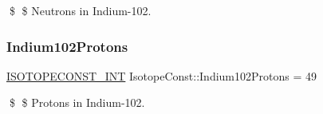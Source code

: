 \$ \$ Neutrons in Indium-\/102. \mbox{\label{group___isotope_const-_indium-_in102_gaba7702a1808d452be2b5a324d088d0d3}} 
\subsubsection{\texorpdfstring{Indium102\+Protons}{Indium102Protons}}
{\footnotesize\ttfamily \mbox{\hyperlink{group___isotope_const-_macros_ga5f18360b3e99483a35c32d789e62621c}{I\+S\+O\+T\+O\+P\+E\+C\+O\+N\+S\+T\+\_\+\+I\+NT}} Isotope\+Const\+::\+Indium102\+Protons = 49}

\$ \$ Protons in Indium-\/102. 